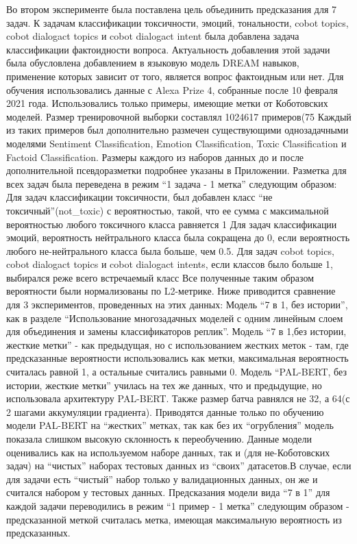 Во втором эксперименте была поставлена цель объединить предсказания для 7 задач. К задачам классификации токсичности, эмоций, тональности, cobot topics, cobot dialogact topics и cobot dialogact intent была добавлена задача классификации фактоидности вопроса. Актуальность добавления этой задачи была обусловлена добавлением в языковую модель DREAM навыков, применение которых зависит от того, является вопрос фактоидным или нет.
Для обучения использовались данные с Alexa Prize 4, собранные после 10 февраля 2021 года. Использовались только примеры, имеющие метки от Коботовских моделей. Размер тренировочной выборки составлял 1024617 примеров(75%
Каждый из таких примеров был дополнительно размечен существующими однозадачными моделями Sentiment Classification, Emotion Classification, Toxic Classification и Factoid Classification. Размеры каждого из наборов данных до и после дополнительной псевдоразметки подробнее указаны в Приложении. 
Разметка для всех задач была переведена в режим “1 задача - 1 метка” следующим образом:
Для задач классификации токсичности, был добавлен класс “не токсичный”(not_toxic) с вероятностью, такой, что ее сумма с максимальной вероятностью любого токсичного класса равняется 1
Для задач классификации эмоций, вероятность нейтрального класса была сокращена до 0, если вероятность любого не-нейтрального класса была больше, чем 0.5.
Для задач cobot topics, cobot dialogact topics и cobot dialogact intents, если классов было больше 1, выбирался реже всего встречаемый класс
Все полученные таким образом вероятности были нормализованы по L2-метрике.
Ниже приводится сравнение для 3 экспериментов, проведенных на этих данных:
Модель “7 в 1, без истории”, как в разделе “Использование многозадачных моделей с одним линейным слоем для объединения и замены классификаторов реплик”. 
Модель “7 в 1,без истории, жесткие метки” - как предыдущая, но с использованием жестких меток - там, где предсказанные вероятности использовались как метки, максимальная вероятность считалась равной 1, а остальные считались равными 0. 
Модель “PAL-BERT, без истории, жесткие метки” училась на тех же данных, что и предыдущие, но использовала архитектуру PAL-BERT. Также размер батча равнялся не 32, а 64(с 2 шагами аккумуляции градиента). Приводятся данные только по обучению модели PAL-BERT на “жестких” метках, так как без их “огрубления” модель показала слишком высокую склонность к переобучению.
Данные модели оценивались как на используемом наборе данных, так и  (для не-Коботовских задач) на “чистых” наборах тестовых данных из “своих” датасетов.В случае, если для задачи есть “чистый” набор только у валидационных данных, он же и считался набором у тестовых данных.
Предсказания модели вида “7 в 1” для каждой задачи переводились в режим “1 пример - 1 метка” следующим образом - предсказанной меткой считалась метка, имеющая максимальную вероятность из предсказанных.



